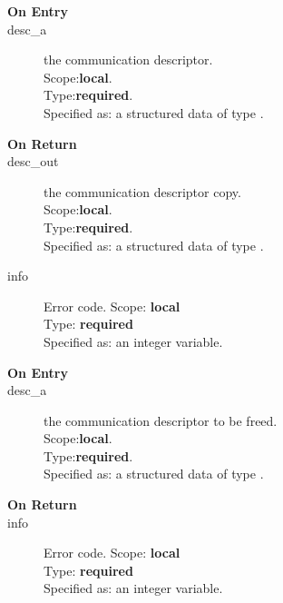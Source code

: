 %
%


\begin{description}
\item[\bf On Entry]
\item[desc\_a] the communication descriptor.\\
Scope:{\bf local}.\\
Type:{\bf required}.\\
Specified as: a structured data of type \descdata.

\end{description}

\begin{description}
\item[\bf On Return]
\item[desc\_out] the communication descriptor copy.\\
Scope:{\bf local}.\\
Type:{\bf required}.\\
Specified as: a structured data of type \descdata.
\item[info] Error code.
Scope: {\bf local} \\
Type: {\bf required}\\
Specified as: an integer variable.\\
\end{description}


%
%


\begin{description}
\item[\bf On Entry]
\item[desc\_a] the communication descriptor to be freed.\\
Scope:{\bf local}.\\
Type:{\bf required}.\\
Specified as: a structured data of type \descdata.
\end{description}

\begin{description}
\item[\bf On Return]
\item[info] Error code.
Scope: {\bf local} \\
Type: {\bf required}\\
Specified as: an integer variable.
\end{description}


